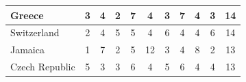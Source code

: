 \documentclass[12pt]{article}  %
\begin{document}
\begin{subappendices}
\begin{longtable}{|l|c|c|c|c|c|c|c|c|c|c|}
	\hline
	Greece                                                         & 3                                                                      & 4                                                                      & 2                                                                      & 7                                                                      & 4                                                                      & 3                                                                      & 7                         & 4                           & 3                           & 14                          \\ 
	\hline
	Switzerland                                                    & 2                                                                      & 4                                                                      & 5                                                                      & 5                                                                      & 4                                                                      & 6                                                                      & 4                         & 4                           & 6                           & 14                          \\ 
	\hline
	Jamaica                                                        & 1                                                                      & 7                                                                      & 2                                                                      & 5                                                                      & 12                                                                     & 3                                                                      & 4                         & 8                           & 2                           & 13                          \\ 
	\hline
	Czech Republic                                                 & 5                                                                      & 3                                                                      & 3                                                                      & 6                                                                      & 4                                                                      & 5                                                                      & 6                         & 4                           & 4                           & 13                          \\ 

\end{longtable}
\end{subappendices}
\end{document}
